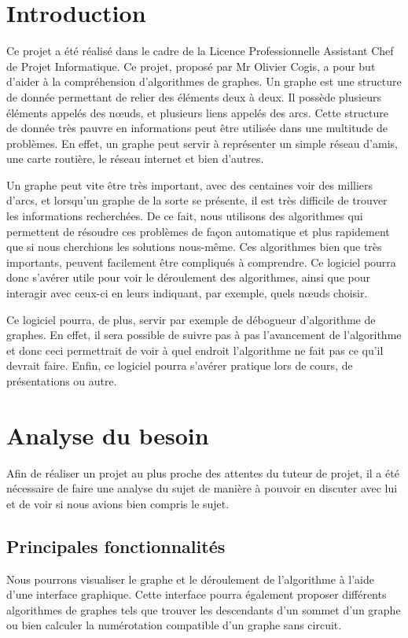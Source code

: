 \documentclass[11pt,a4paper]{article}
\begin{document}
	\newpage
	\section{Introduction}
	Ce projet a été réalisé dans le cadre de la Licence Professionnelle Assistant Chef de Projet Informatique. Ce projet, proposé par Mr Olivier Cogis, a pour but d'aider à la compréhension d'algorithmes de graphes. Un graphe est une structure de donnée permettant de relier des éléments deux à deux. Il possède plusieurs éléments appelés des n\oe uds, et plusieurs liens appelés des arcs. Cette structure de donnée très pauvre en informations peut être utilisée dans une multitude de problèmes. En effet, un graphe peut servir à représenter un simple réseau d'amis, une carte routière, le réseau internet et bien d'autres. 
	
	Un graphe peut vite être très important, avec des centaines voir des milliers d'arcs, et lorsqu'un graphe de la sorte se présente, il est très difficile de trouver les informations recherchées. De ce fait, nous utilisons des algorithmes qui permettent de résoudre ces problèmes de façon automatique et plus rapidement que si nous cherchions les solutions nous-même. Ces algorithmes bien que très importants, peuvent facilement être compliqués à comprendre. Ce logiciel pourra donc s'avérer utile pour voir le déroulement des algorithmes, ainsi que pour interagir avec ceux-ci en leurs indiquant, par exemple, quels nœuds choisir. 
	
	Ce logiciel pourra, de plus, servir par exemple de débogueur d'algorithme de graphes. En effet, il sera possible de suivre pas à pas l'avancement de l'algorithme et donc ceci permettrait de voir à quel endroit l'algorithme ne fait pas ce qu'il devrait faire. Enfin, ce logiciel pourra s'avérer pratique lors de cours, de présentations ou autre.
	
	\newpage
	\section{Analyse du besoin}
		
		Afin de réaliser un projet au plus proche des attentes du tuteur de projet, il a été nécessaire de faire une analyse du sujet de manière à pouvoir en discuter avec lui et de voir si nous avions bien compris le sujet.
		\subsection{Principales fonctionnalités}
		    Nous pourrons visualiser le graphe et le déroulement de l'algorithme à l'aide d'une interface graphique. Cette interface pourra également proposer différents algorithmes de graphes tels que trouver les descendants d'un sommet d'un graphe ou bien calculer la numérotation compatible d'un graphe sans circuit. 
		    
\end{document}
